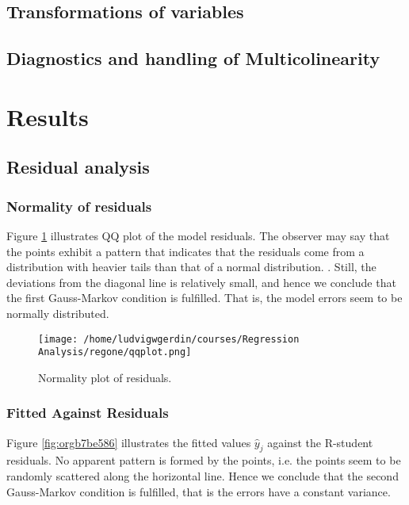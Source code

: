 \documentclass[11pt]{article}
\begin{document}
\subsection{Transformations of variables}
\label{sec:org885c739}
\subsection{Diagnostics and handling of Multicolinearity}
\label{sec:orgf8a49dc}
\section{Results}
\label{sec:orgce9a94b}
\subsection{Residual analysis}
\label{sec:org9eec0f3}
\subsubsection{Normality of residuals}
\label{sec:org4c7f0a6}

Figure \ref{fig:org1d7b176} illustrates QQ plot of the model residuals. The observer may say that the 
points exhibit a pattern that indicates that the residuals come from a distribution with heavier tails
than that of a normal distribution. 
\cite{Montgomery2012}. Still, the deviations from the diagonal line is relatively small, and hence
we conclude that the first Gauss-Markov condition is fulfilled. That is, the model errors seem to be 
normally distributed.

\begin{figure}[htbp]
\centering
\texttt{[image: /home/ludvigwgerdin/courses/Regression Analysis/regone/qqplot.png]}
\caption{\label{fig:org1d7b176}
Normality plot of residuals.}
\end{figure}

\subsubsection{Fitted Against Residuals}
\label{sec:org4e9f741}

Figure \ref{fig:orgb7be586} illustrates the fitted values \(\hat y_j\) against the R-student residuals. No apparent 
pattern is formed by the points, i.e. the points seem to be randomly scattered along the horizontal line.
Hence we conclude that the second Gauss-Markov condition is fulfilled, that is the errors have a constant 
variance.
\end{document}
